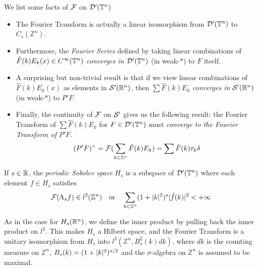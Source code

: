 \documentclass[../main-v2-manifolds.tex]{subfiles}
\begin{document}
We list some facts of $\mathcal{F}$ on $\mathcal{D}'({\mathbb{T}^n})$
\begin{itemize}
    \item The Fourier Transform is actually a linear isomorphism from $\mathcal{D}'({\mathbb{T}^n})$ to $C_s(\mathbb{Z}^n)$. 

    \item Furthermore, the \emph{Fourier Series} defined by taking linear combinations of $\hat{F}(k)E_k(x)\in C^\infty({\mathbb{T}^n})$ \emph{converges in $\mathcal{D}'({\mathbb{T}^n})$} (in weak-$\ast$) to $F$ itself. 
    
    \item A surprising but non-trivial result is that if we view linear combinations of $\hat{F}(k)E_k(x)$ as elements in $\mathcal{S}'({\mathbb{R}^n})$, then $\sum \hat{F}(k)E_k$ \emph{converges in $\mathcal{S}'({\mathbb{R}^n})$} (in weak-$\ast$) to $P'F$.
    
    \item Finally, the continuity of $\mathcal{F}$ on $\mathcal{S}'$ gives us the following result: the Fourier Transform of $\sum \hat{F}(k)E_k$ for $F\in \mathcal{D}'({\mathbb{T}^n})$ must \emph{converge to the Fourier Transform of $P'F$}. 
    \[
    (P'F)^{\wedge} = \mathcal{F}(\sum_{k\in\mathbb{Z}^n} \hat{F}(k)E_k) = \sum \hat{F}(k)\tau_k\delta
    \]
\end{itemize}


\begin{definition}\label{def:periodic l2 sobolev space}
If $s\in\mathbb{R}$, the \emph{periodic Sobolev space} $H_s$ is a subspace of $\mathcal{D}'({\mathbb{T}^n})$ where each element $f\in H_s$ satisfies
\[
\mathcal{F}(\Lambda_s f)\in l^2(\mathbb{Z}^n)\quad\text{or}\quad \sum_{k\in\mathbb{Z}^n}(1+\vert {k} \vert^2)^s\vert\hat{f}(k)\vert^2< +\infty
\]
\end{definition}
As in the case for $H_s({\mathbb{R}^n})$, we define the inner product by pulling back the inner product on $l^2$. This makes $H_s$ a Hilbert space, and the Fourier Transform is a unitary isomorphism from $H_s$ into $l^2(\mathbb{Z}^n, B_s^2(k)dk)$, where $dk$ is the counting measure on $\mathbb{Z}^n$, $B_s(k)=(1+\vert {k} \vert^2)^{s/2}$ and the $\sigma$-algebra on $\mathbb{Z}^n$ is assumed to be maximal. \\
\end{document}
